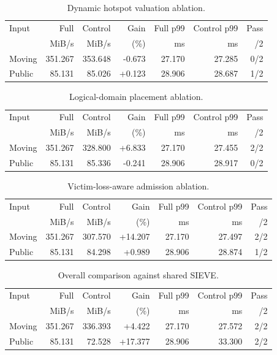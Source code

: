 \begin{table}[t]
\centering
\caption{Dynamic hotspot valuation ablation.}
\label{tab:final-nohotspot}
\scriptsize
\begin{tabular}{lrrrrrr}
\toprule
Input & Full & Control & Gain & Full p99 & Control p99 & Pass \\
 & MiB/s & MiB/s & (\%) & ms & ms & /2 \\
\midrule
Moving & 351.267 & 353.648 & -0.673 & 27.170 & 27.285 & 0/2 \\
Public & 85.131 & 85.026 & +0.123 & 28.906 & 28.687 & 1/2 \\
\bottomrule
\end{tabular}
\end{table}

\begin{table}[t]
\centering
\caption{Logical-domain placement ablation.}
\label{tab:final-noaffinity}
\scriptsize
\begin{tabular}{lrrrrrr}
\toprule
Input & Full & Control & Gain & Full p99 & Control p99 & Pass \\
 & MiB/s & MiB/s & (\%) & ms & ms & /2 \\
\midrule
Moving & 351.267 & 328.800 & +6.833 & 27.170 & 27.455 & 2/2 \\
Public & 85.131 & 85.336 & -0.241 & 28.906 & 28.917 & 0/2 \\
\bottomrule
\end{tabular}
\end{table}

\begin{table}[t]
\centering
\caption{Victim-loss-aware admission ablation.}
\label{tab:final-nojoint}
\scriptsize
\begin{tabular}{lrrrrrr}
\toprule
Input & Full & Control & Gain & Full p99 & Control p99 & Pass \\
 & MiB/s & MiB/s & (\%) & ms & ms & /2 \\
\midrule
Moving & 351.267 & 307.570 & +14.207 & 27.170 & 27.497 & 2/2 \\
Public & 85.131 & 84.298 & +0.989 & 28.906 & 28.874 & 1/2 \\
\bottomrule
\end{tabular}
\end{table}

\begin{table}[t]
\centering
\caption{Overall comparison against shared SIEVE.}
\label{tab:final-poolsieve1}
\scriptsize
\begin{tabular}{lrrrrrr}
\toprule
Input & Full & Control & Gain & Full p99 & Control p99 & Pass \\
 & MiB/s & MiB/s & (\%) & ms & ms & /2 \\
\midrule
Moving & 351.267 & 336.393 & +4.422 & 27.170 & 27.572 & 2/2 \\
Public & 85.131 & 72.528 & +17.377 & 28.906 & 33.300 & 2/2 \\
\bottomrule
\end{tabular}
\end{table}

